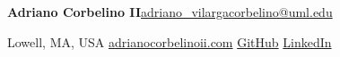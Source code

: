 {\Huge\bfseries Adriano Corbelino II}\hfill\href{mailto:adriano_vilargacorbelino@uml.edu}{\normalsize adriano\_vilargacorbelino@uml.edu}

\vspace{2pt}
{\small Lowell, MA, USA \quad\textbullet\quad \href{https://adrianocorbelinoii.com}{adrianocorbelinoii.com} \quad\textbullet\quad \href{https://github.com/AdrianoII}{GitHub} \quad\textbullet\quad \href{https://www.linkedin.com/in/adrianoii/}{LinkedIn}}

\vspace{4pt}
